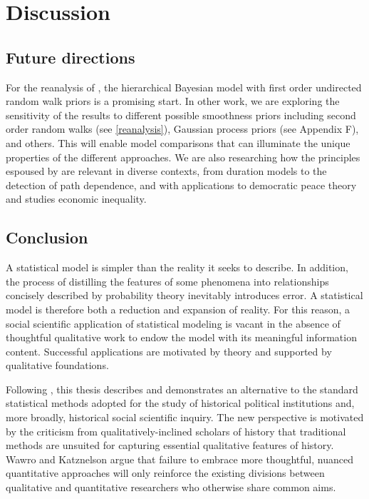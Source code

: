 \chapter{Discussion}
\label{discussion}

\section{Future directions}

For the reanalysis of , the hierarchical Bayesian model with first order 
undirected random walk priors is a promising start. In other work, we are exploring the sensitivity of the 
results to different possible smoothness priors including second order random walks (see \ref{reanalysis}), 
Gaussian process priors (see Appendix F), and others. 
This will enable model comparisons that can illuminate the unique 
properties of the different approaches. We are also researching how the principles 
espoused by  are relevant in diverse contexts, from 
duration models to the detection of path dependence, and with applications to 
 democratic peace theory and studies economic inequality. 
 
 
\section{Conclusion}

A statistical model is simpler than the reality it seeks to describe. In addition, the 
process of distilling the features of some phenomena into relationships concisely 
described by probability theory inevitably introduces error. A statistical model is 
therefore both a reduction and expansion of reality. For this reason, a social scientific 
application of statistical modeling is vacant in the absence of thoughtful qualitative 
work to endow the model with its meaningful information content. Successful 
applications are motivated by theory and supported by qualitative foundations. 

Following , this thesis describes and demonstrates 
an alternative to the standard statistical methods adopted for the study of historical 
political institutions and, more broadly, historical social scientific inquiry. The new perspective is 
motivated by the criticism from qualitatively-inclined scholars of history that traditional methods 
are unsuited for capturing essential qualitative features of history. 
Wawro and Katznelson argue that failure to embrace more thoughtful, nuanced quantitative 
approaches will only reinforce the existing divisions between qualitative and quantitative 
researchers who otherwise share common aims. 

